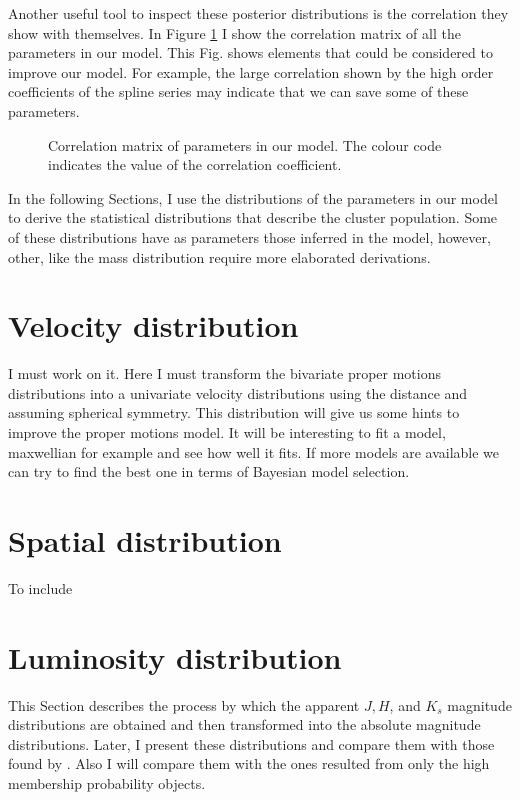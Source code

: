 Another useful tool to inspect these posterior distributions is the correlation they show with themselves. In Figure \ref{fig:correlations} I show the correlation matrix of all the parameters in our model. This Fig. shows elements that could be considered to improve our model. 
For example, the large correlation shown by the high order coefficients of the spline series may indicate that we can save some of these parameters.   

\begin{figure}[htbp]
\begin{center}
\caption{Correlation matrix of parameters in our model. The colour code indicates the value of the correlation coefficient.}
\label{fig:correlations}
\end{center}
\end{figure}

In the following Sections, I use the distributions of the parameters in our model to derive the statistical distributions that describe the cluster population. Some of these distributions have as parameters those inferred in the model, however, other, like the mass distribution require more elaborated derivations.  

\section{Velocity distribution}
I must work on it. Here I must transform the bivariate proper motions distributions into a univariate velocity distributions using the distance and assuming spherical symmetry. This distribution will give us some hints to improve the proper motions model. It will be interesting to fit a model, maxwellian for example and see how well it fits. If more models are available we can try to find the best one in terms of Bayesian model selection. 
\section{Spatial distribution}
To include
\section{Luminosity distribution}
\label{sect:luminosity}
This Section describes the process by which the apparent $J,H$, and $K_s$ magnitude distributions are obtained and then transformed into the absolute magnitude distributions. Later, I present  these distributions and compare them with those found by \citet{Bouy2015}. Also I will compare them with the ones resulted from only the high membership probability objects.
